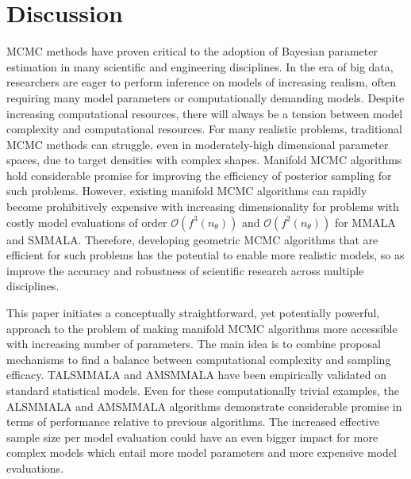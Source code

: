 \documentclass[twoside,11pt]{article}
\begin{document}
\newpage
\section{Discussion}

MCMC methods have proven critical to the adoption of Bayesian parameter estimation in many scientific and engineering 
disciplines. In the era of big data, researchers are eager to perform inference on models of increasing realism, often 
requiring many model parameters or computationally demanding models. Despite increasing computational resources, there will 
always be a tension between model complexity and computational resources. For many realistic problems, traditional MCMC 
methods can struggle, even in moderately-high dimensional parameter spaces, due to target densities with complex shapes.  
Manifold MCMC algorithms hold considerable promise for improving the efficiency of posterior sampling for such problems.  
However, existing manifold MCMC algorithms can rapidly become prohibitively expensive with increasing dimensionality for 
problems with costly model evaluations of order $\mathcal{O}(f^3(n_{\theta}))$ and $\mathcal{O}(f^2(n_{\theta}))$ for 
MMALA and SMMALA. Therefore, developing geometric MCMC algorithms that are efficient for such problems has the potential to 
enable more realistic models, so as improve the accuracy and robustness of scientific research across multiple disciplines. 

This paper initiates a conceptually straightforward, yet potentially powerful, approach to the problem of making manifold 
MCMC algorithms more accessible with increasing number of parameters. The main idea is to combine proposal mechanisms to 
find a balance between computational complexity and sampling efficacy. TALSMMALA and AMSMMALA have been empirically 
validated on standard statistical models. Even for these computationally trivial examples, the ALSMMALA and AMSMMALA 
algorithms demonstrate considerable promise in terms of performance relative to previous algorithms. The increased effective 
sample size per model evaluation could have an even bigger impact for more complex models which entail more model parameters 
and more expensive model evaluations.  
\end{document}
